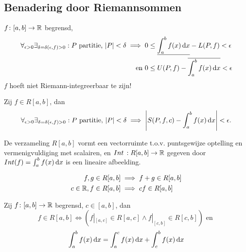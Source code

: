 \documentclass{2wa40summary}
\begin{document}
		\subsection{Benadering door Riemannsommen}
			\begin{theorem}
				$ f\colon [a,b] \to \mathbb{R}  $ begrensd,
				\begin{align*}
					\forall_{\epsilon >0} \exists_{\delta = \delta (\epsilon,f)>0}: P \text{ partitie, } \abs{P}<\delta \implies 0 &\le \ul{\int_a^b f(x) \d x} - L(P,f) < \epsilon  \\
					\text{ en }0 &\le U(P,f) - \overline{\int_a^b f(x)\d x} <\epsilon
				 \end{align*}
				 \opm $f$ hoeft niet Riemann-integreerbaar te zijn!
			\end{theorem}
			\begin{theorem}
				Zij $ f \in R[a,b] $, dan
				\[ 
					\forall_{\epsilon >0} \exists_{\delta = \delta (\epsilon,f)>0}: P \text{ partitie, } \abs{P}<\delta \implies \abs{S(P,f,c) - \int_a^b f(x) \d x} < \epsilon.
				 \]
			\end{theorem}
			\begin{theorem}[\text{[K]} 6.3.1]
				De verzameling $R[a,b]$ vormt een vectorruimte t.o.v. puntsgewijze optelling en vermenigvuldiging met scalairen, en $ \mathop{Int}\\:  R[a,b] \to \mathbb{R} $ gegeven door $ \mathop{Int}(f) = \int_a^b f(x)\mathop{}\!\mathrm{d} x $ is een lineaire afbeelding.
				\begin{gevolg}
					\begin{align*}
						f,g \in R[a,b] &\implies f+g \in R[a,b] \\
						c \in \mathbb{R}, f\in R[a,b] &\implies cf \in R[a,b]
					 \end{align*}
				\end{gevolg}
			\end{theorem}
			\begin{theorem}
				Zij $f\colon [a,b] \to \mathbb{R}$ begrensd, $c\in [a,b]$, dan
				\[ 
					f \in R[a,b] \iff (f|_{[a,c]} \in R[a,c] \wedge f|_{[c,b]} \in R[c,b]) \text{ en }
				 \]
				 \[ 
					 \int_a^b f(x)\mathop{}\!\mathrm{d} x = \int_a^c f(x) \mathop{}\!\mathrm{d} x + \int_c^b f(x) \mathop{}\!\mathrm{d} x
				  \]
			\end{theorem}
			
\end{document}
